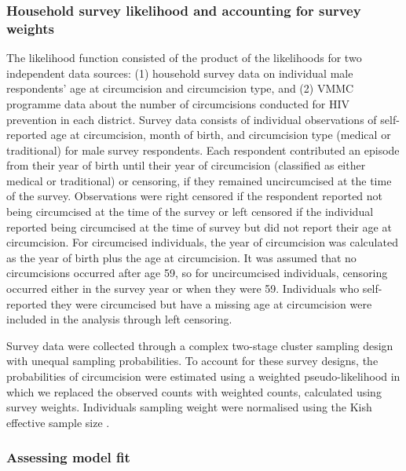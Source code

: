 \documentclass{article}
\begin{document}

\subsubsection*{Household survey likelihood and accounting for survey weights}


The likelihood function consisted of the product of the likelihoods for two independent data sources: (1) household survey data on individual male respondents' age at circumcision and circumcision type, and (2) VMMC programme data about the number of circumcisions conducted for HIV prevention in each district. Survey data consists of individual observations of self-reported age at circumcision, month of birth, and circumcision type (medical or traditional) for male survey respondents. Each respondent contributed an episode from their year of birth until their year of circumcision (classified as either medical or traditional) or censoring, if they remained uncircumcised at the time of the survey. Observations were right censored if the respondent reported not being circumcised at the time of the survey or left censored if the individual reported being circumcised at the time of survey but did not report their age at circumcision. For circumcised individuals, the year of circumcision was calculated as the year of birth plus the age at circumcision. It was assumed that no circumcisions occurred after age 59, so for uncircumcised individuals, censoring occurred either in the survey year or when they were 59. Individuals who self-reported they were circumcised but have a missing age at circumcision were included in the analysis through left censoring.

Survey data were collected through a complex two-stage cluster sampling design with unequal sampling probabilities. To account for these survey designs, the probabilities of circumcision were estimated using a weighted pseudo-likelihood in which we replaced the observed counts with weighted counts, calculated using survey weights. Individuals sampling weight were normalised using the Kish effective sample size \autocite{kish1965survey}.


\subsubsection*{Assessing model fit}
\end{document}
